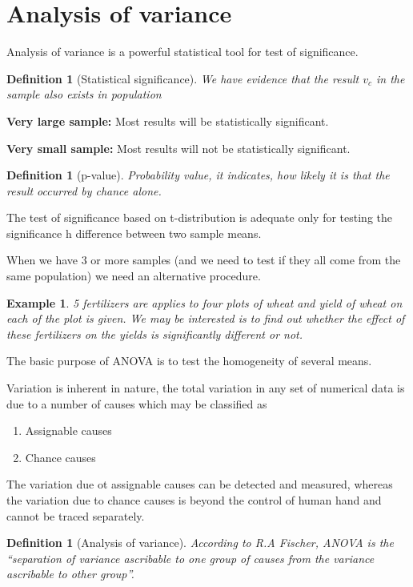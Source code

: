 \documentclass[oneside,11pt,pdftex]{book}%
\numberwithin{equation}{section}
\newtheorem{example}[theorem]{Example}
\newtheorem{definition}[theorem]{Definition}
\numberwithin{section}{chapter}
\numberwithin{equation}{chapter}
\begin{document}
\section{Analysis of variance}
Analysis of variance is a powerful statistical tool for test of significance. 
\begin{definition}[Statistical significance]\label{def:significance}
	We have evidence that the result $ v_c $ in the sample also exists in population
\end{definition}

\textbf{Very large sample: }Most results will be statistically significant.\par
\textbf{Very small sample: }Most results will not be statistically significant.

\begin{definition}[p-value]
	Probability value, it indicates, how likely it is that the result occurred by chance alone.
\end{definition}

The test of significance based on t-distribution is adequate only for testing the significance h difference between two sample means.
\par
When we have 3 or more samples (and we need to test if they all come from the same population) we need an alternative procedure.
\par
\begin{example}
	5 fertilizers are applies to four plots of wheat and yield of wheat on each of the plot is given. We may be interested is to find out whether the effect of these fertilizers on the yields is significantly different or not.
\end{example}

The basic purpose of ANOVA is to test the homogeneity of several means.\par
Variation is inherent in nature, the total variation in any set of numerical data is due to a number of causes which may be classified as 
\begin{enumerate}
	\item Assignable causes
	\item Chance causes
\end{enumerate}

The variation due ot assignable causes can be detected and measured, whereas the variation due to chance causes is beyond the control of human hand and cannot be traced separately. 

\begin{definition}[Analysis of variance]
	According to R.A Fischer, ANOVA is the ``separation of variance ascribable to one group of causes from the variance ascribable to other group''.
\end{definition}
\end{document}
